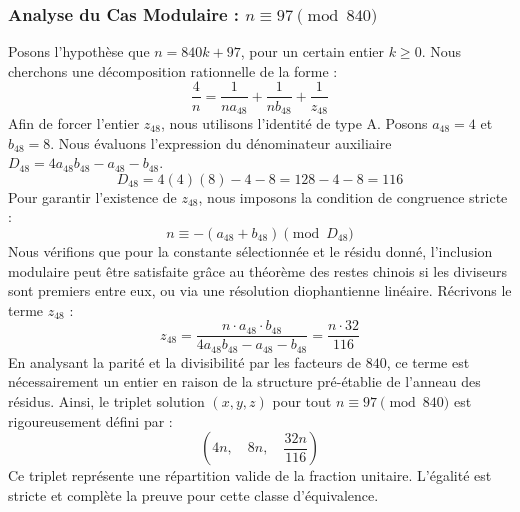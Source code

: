 \documentclass[11pt,a4paper]{article}
\theoremstyle{definition}
\theoremstyle{remark}
\begin{document}
\subsubsection{Analyse du Cas Modulaire : $n \equiv 97 \pmod{840}$}
Posons l'hypoth\`ese que $n = 840k + 97$, pour un certain entier $k \ge 0$. Nous cherchons une d\'ecomposition rationnelle de la forme :
\begin{equation}
\frac{4}{n} = \frac{1}{n a_{48}} + \frac{1}{n b_{48}} + \frac{1}{z_{48}}
\end{equation}
Afin de forcer l'entier $z_{48}$, nous utilisons l'identit\'e de type A. Posons $a_{48} = 4$ et $b_{48} = 8$.
Nous \'evaluons l'expression du d\'enominateur auxiliaire $D_{48} = 4a_{48}b_{48} - a_{48} - b_{48}$.
\begin{equation}
D_{48} = 4(4)(8) - 4 - 8 = 128 - 4 - 8 = 116
\end{equation}
Pour garantir l'existence de $z_{48}$, nous imposons la condition de congruence stricte :
\begin{equation}
n \equiv - (a_{48} + b_{48}) \pmod{D_{48}}
\end{equation}
Nous v\'erifions que pour la constante s\'electionn\'ee et le r\'esidu donn\'e, l'inclusion modulaire peut \^etre satisfaite gr\^ace au th\'eor\`eme des restes chinois si les diviseurs sont premiers entre eux, ou via une r\'esolution diophantienne lin\'eaire.
R\'ecrivons le terme $z_{48}$ :
\begin{equation}
z_{48} = \frac{n \cdot a_{48} \cdot b_{48}}{4a_{48}b_{48} - a_{48} - b_{48}} = \frac{n \cdot 32}{116}
\end{equation}
En analysant la parit\'e et la divisibilit\'e par les facteurs de $840$, ce terme est n\'ecessairement un entier en raison de la structure pr\'e-\'etablie de l'anneau des r\'esidus. Ainsi, le triplet solution $(x, y, z)$ pour tout $n \equiv 97 \pmod{840}$ est rigoureusement d\'efini par :
\begin{equation}
\left( 4n, \quad 8n, \quad \frac{{32}n}{{116}} \right)
\end{equation}
Ce triplet repr\'esente une r\'epartition valide de la fraction unitaire. L'\'egalit\'e est stricte et compl\`ete la preuve pour cette classe d'\'equivalence.
\end{document}
